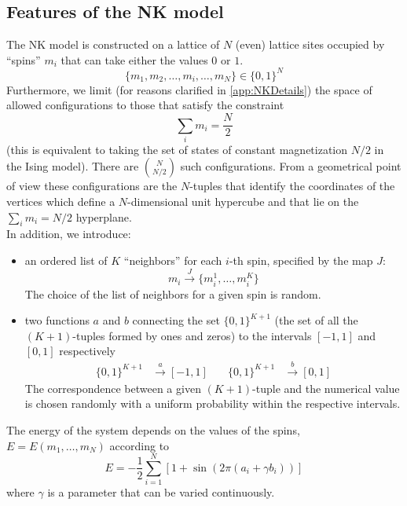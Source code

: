\subsection{Features of the NK model}

The NK model is constructed on a lattice of $N$ (even) lattice sites occupied by ``spins'' $m_{i}$ that can take either the values $0$ or $1$.
\begin{equation}
\{m_1, m_2, \ldots, m_i, \ldots, m_{N} \} \in \{0, 1\}^{N}
\end{equation}
Furthermore, we limit (for reasons clarified in \autoref{app:NKDetails}) the space of allowed configurations to those that satisfy the constraint
\begin{equation}
\sum_{i} m_{i} = \frac{N}{2}
\end{equation}
(this is equivalent to taking the set of states of constant magnetization $N/2$ in the Ising model).
There are $\binom{N}{N/2}$ such configurations. From a geometrical point of view these configurations are the $N$-tuples that identify the coordinates of the vertices which define a $N$-dimensional unit hypercube and that lie on the $\sum_{i} m_{i} = N/2$ hyperplane.\\ 
In addition, we introduce:
\begin{itemize}
	\item an ordered list of $K$ ``neighbors'' for each $i$-th spin, specified by the map $J$: 
	\begin{equation}
		m_{i} \xrightarrow{J} \{m_{i}^{1}, \ldots, m_{i}^{K}\}
		\label{eq:NKNeighbors}	
	\end{equation} 
	The choice of the list of neighbors for a given spin is random.
	\item two functions $a$ and $b$ connecting the set $\{0, 1\}^{K+1}$ (the set of all the $(K+1)$-tuples formed by ones and zeros) to the intervals $[-1,1]$ and $[0,1]$ respectively
	\begin{align}
		\{0, 1\}^{K+1} & \xrightarrow{a} [-1,1]  & \quad		\{0, 1\}^{K+1} & \xrightarrow{b} [0,1]
		\label{eq:NKCouplings}
	\end{align}
	The correspondence between a given $(K+1)$-tuple and the numerical value is chosen randomly with a uniform probability within the respective intervals.
\end{itemize}
 
The energy of the system depends on the values of the spins, $E = E(m_{1}, \ldots, m_{N})$ according to
\begin{equation}
	E = -\frac{1}{2} \sum_{i = 1}^{N} \left[ 1 + \sin(2 \pi (a_{i} + \gamma b_{i})) \right]
	\label{eq:NKEnergy}
\end{equation}
where $\gamma$ is a parameter that can be varied continuously.

